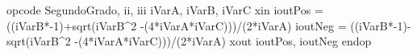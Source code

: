 opcode SegundoGrado, ii, iii          
iVarA, iVarB, iVarC   xin            
ioutPos    =  ((iVarB*-1)+sqrt(iVarB^2 -(4*iVarA*iVarC)))/(2*iVarA)
ioutNeg    =  ((iVarB*-1)-sqrt(iVarB^2 -(4*iVarA*iVarC)))/(2*iVarA)
xout ioutPos, ioutNeg     
endop